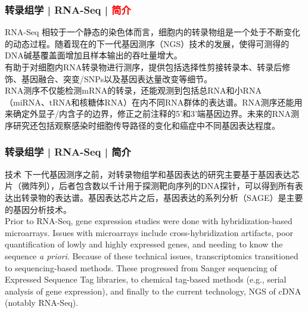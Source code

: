 \begin{frame}
  \frametitle{转录组学 | RNA-Seq | \textcolor{red}{简介}}
  \begin{block}{RNA-Seq}
相较于一个静态的染色体而言，细胞内的转录物组是一个处于不断变化的动态过程。随着现在的下一代基因测序（NGS）技术的发展，使得可测得的DNA碱基覆盖面增加且样本输出的吞吐量增大。\\
\vspace{0.5em}
有助于对细胞内RNA转录物进行测序，提供包括选择性剪接转录本、转录后修饰、基因融合、突变/SNPs以及基因表达量改变等细节。\\
\vspace{0.5em}
RNA测序不仅能检测mRNA的转录，还能观测到包括总RNA和小RNA（miRNA、tRNA和核糖体RNA）在内不同RNA群体的表达谱。RNA测序还能用来确定外显子/内含子的边界，修正之前注释的5'和3'端基因边界。未来的RNA测序研究还包括观察感染时细胞传导路径的变化和癌症中不同基因表达程度。
  \end{block}
\end{frame}

\begin{frame}
  \frametitle{转录组学 | RNA-Seq | 简介}
  \begin{block}{技术}
下一代基因测序之前，对转录物组学和基因表达的研究主要基于基因表达芯片（微阵列），后者包含数以千计用于探测靶向序列的DNA探针，可以得到所有表达出转录物的表达谱。基因表达芯片之后，基因表达的系列分析（SAGE）是主要的基因分析技术。\\
\vspace{1em}
Prior to RNA-Seq, gene expression studies were done with hybridization-based microarrays. Issues with microarrays include cross-hybridization artifacts, poor quantification of lowly and highly expressed genes, and needing to know the sequence \textit{a priori}. Because of these technical issues, transcriptomics transitioned to sequencing-based methods. These progressed from Sanger sequencing of Expressed Sequence Tag libraries, to chemical tag-based methods (e.g., serial analysis of gene expression), and finally to the current technology, NGS of cDNA (notably RNA-Seq).
  \end{block}
\end{frame}

